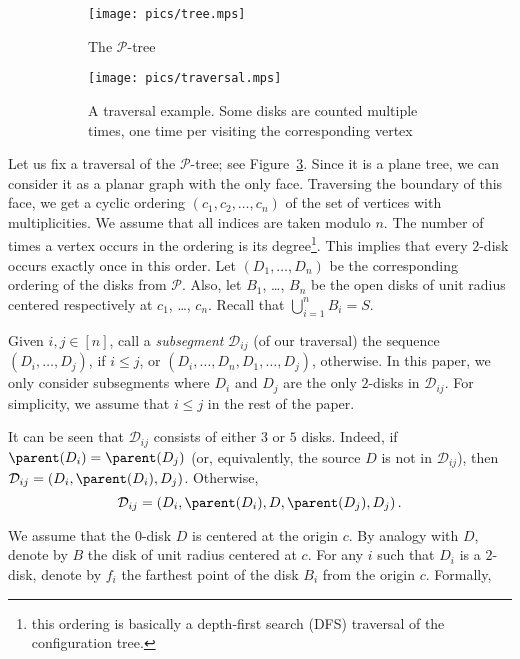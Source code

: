 \begin{figure}[h!]
    \centering
    \begin{subfigure}[t]{.48\textwidth}
    \texttt{[image: pics/tree.mps]}
    \caption{The $\mathcal{P}$-tree}
    \label{fig:tree}
    \end{subfigure}
    \begin{subfigure}[t]{.48\textwidth}
    \texttt{[image: pics/traversal.mps]}
    \caption{A traversal example. Some disks are counted multiple times, one time per visiting the corresponding vertex}
    \label{fig:traversal}
    \end{subfigure}
    \caption{}
\end{figure}

Let us fix a traversal of the $\mathcal{P}$-tree; see Figure~\ref{fig:traversal}.
Since it is a plane tree, we can consider it as a planar graph with the only face. Traversing the boundary of this face, we get a cyclic ordering $(c_1, c_2, \ldots, c_n)$ of the set of vertices with multiplicities. We assume that all indices are taken modulo $n$. The number of times a vertex occurs in the ordering is its degree\footnote{this ordering is basically a depth-first search (DFS) traversal of the configuration tree.}.
This implies that every $2$-disk occurs exactly once in this order.
Let $(D_1, \ldots, D_n)$ be the corresponding ordering of the disks from $\mathcal{P}$. %
Also, let $B_1$, \ldots, $B_n$ be the open disks of unit radius centered respectively at $c_1$, \ldots, $c_n$. %
Recall that $\bigcup_{i=1}^nB_i = S$.

Given $i,j\in[n]$, call a \textit{subsegment} $\mathcal{D}_{ij}$ (of our traversal) the sequence $(D_i, \ldots, D_j)$, if $i \leq j$, or $(D_i, \ldots, D_n, D_1, \ldots, D_j)$, otherwise. In this paper, we only consider subsegments where $D_i$ and $D_j$ are the only $2$-disks in $\mathcal{D}_{ij}$. For simplicity, we assume that $i\leq j$ in the rest of the paper.

It can be seen that $\mathcal{D}_{ij}$ consists of either $3$ or $5$ disks. Indeed, if $\parent(D_i) = \parent(D_j)$ (or, equivalently, the source $D$ is not in $\mathcal{D}_{ij}$), then $\mathcal{D}_{ij} = (D_i, \parent(D_i), D_j)$. Otherwise, $$\mathcal{D}_{ij} = \left(D_i, \parent(D_i), D, \parent(D_j), D_j\right).$$

We assume that the $0$-disk $D$ is centered at the origin $c$. By analogy with $D$, denote by $B$ the disk of unit radius centered at $c$. For any $i$ such that $D_i$ is a $2$-disk, denote by $f_i$ the farthest point of the disk $B_i$ from the origin $c$.
Formally,

